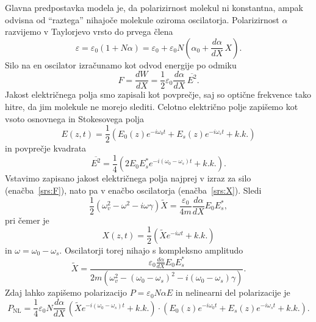 Glavna predpostavka modela je, da polarizirnost molekul ni konstantna, ampak odvisna od 
``raztega'' nihajoče molekule oziroma oscilatorja. Polarizirnost $\alpha$ 
razvijemo v Taylorjevo vrsto do prvega člena 
\begin{equation}
\varepsilon = \varepsilon_0(1+N\alpha) = \varepsilon_0+\varepsilon_0N\left(\alpha_0 + 
\frac{d\alpha}{dX}\,X\right).
\label{srs:a}
\end{equation}
Silo na en oscilator izračunamo kot odvod energije po odmiku
\begin{equation}
F = \frac{dW}{dX}= \frac{1}{2}\varepsilon_0 \frac{d\alpha}{dX}\,\overline{E^2}.
\label{srs:F}
\end{equation}
Jakost električnega polja smo zapisali kot povprečje, saj so optične frekvence 
tako hitre, da jim molekule ne morejo slediti. 
Celotno električno polje zapišemo kot vsoto osnovnega in Stokesovega polja
\begin{equation}
E(z,t)= \frac{1}{2}\left( E_0(z)e^{-i\omega_0t}+ E_s(z)e^{-i\omega_st} + k.k.\right)
\end{equation}
in povprečje kvadrata
\begin{equation}
\overline{E^2} = \frac{1}{4}\left(2E_0E_s^* e^{-i(\omega_0-\omega_s)t}+k.k.\right).
\end{equation}
Vstavimo zapisano jakost električnega polja najprej v izraz za silo (enačba~\ref{srs:F}),
nato pa v enačbo oscilatorja (enačba~\ref{srs:X}). Sledi
\begin{equation}
\frac{1}{2}\left(\omega_v^2-\omega^2-i\omega\gamma\right)\tilde{X} = 
\frac{\varepsilon_0}{4m}\frac{d\alpha}{dX}E_0 E_s^*,
\end{equation}
pri čemer je 
\begin{equation}
X(z,t) = \frac{1}{2}\left(\tilde{X}e^{-i\omega t}+ k.k.\right)
\end{equation}
in $\omega = \omega_0-\omega_s$. Oscilatorji torej nihajo s kompleksno amplitudo
\begin{equation}
\tilde{X} = \frac{\varepsilon_0\frac{d\alpha}{dX}E_0 E_s^*}{2m\left(
\omega_v^2-(\omega_0-\omega_s)^2-i(\omega_0-\omega_s)\gamma\right)}.
\end{equation}
Zdaj lahko zapišemo polarizacijo $P = \varepsilon_0N\alpha E$ in nelinearni del
polarizacije je
\begin{equation}
P_{\mathrm{NL}} = \frac{1}{4}\varepsilon_0 N \frac{d\alpha}{dX} \, \left(\tilde{X}
e^{-i(\omega_0-\omega_s)t}
+ k.k.\right) \cdot \left( E_0(z)e^{-i\omega_0t}+ E_s(z)e^{-i\omega_st} + k.k.\right).
\end{equation}
